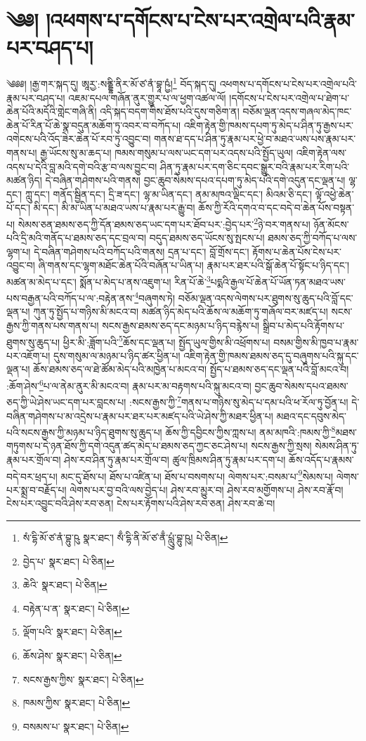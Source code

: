 \setcounter{footnote}{0} 
\chapter{༄༅། །འཕགས་པ་དགོངས་པ་ངེས་པར་འགྲེལ་པའི་རྣམ་པར་བཤད་པ།}༄༅༅། །རྒྱ་གར་སྐད་དུ། ཨཱརྱ་:སནྡྷི་ནིར་མོ་ཙ་ནཾ་བྷཱ་ཥྱཾ།\footnote{སཾ་དྷི་མོ་ཙ་ནཾ་བྷུ་ཥུ  སྣར་ཐང་། སྃ་དྷི་ནི་མོ་ཙ་ནྃ་པླུུཾ་བྷུ་ཥུ།  པེ་ཅིན། } བོད་སྐད་དུ། འཕགས་པ་དགོངས་པ་ངེས་པར་འགྲེལ་པའི་རྣམ་པར་བཤད་པ། འཇམ་དཔལ་གཞོན་ནུར་གྱུར་པ་ལ་ཕྱག་འཚལ་ལོ། །དགོངས་པ་ངེས་པར་འགྲེལ་པ་ཐེག་པ་ཆེན་པོའི་མདོའི་གླེང་གཞི་ནི། འདི་སྐད་བདག་གིས་ཐོས་པའི་དུས་གཅིག་ན། བཅོམ་ལྡན་འདས་གཞལ་མེད་ཁང་ཆེན་པོ་རིན་པོ་ཆེ་སྣ་བདུན་མཆོག་ཏུ་འབར་བ་བཀོད་པ། འཇིག་རྟེན་གྱི་ཁམས་དཔག་ཏུ་མེད་པ་ཤིན་ཏུ་རྒྱས་པར་འགེངས་པའི་འོད་ཟེར་ཆེན་པོ་རབ་ཏུ་འབྱུང་བ། གནས་ཐ་དད་པ་ཤིན་ཏུ་རྣམ་པར་ཕྱེ་བ་མཐའ་ཡས་པས་རྣམ་པར་གནས་པ། རྒྱ་ཡོངས་སུ་མ་ཆད་པ། ཁམས་གསུམ་པ་ལས་ཡང་དག་པར་འདས་པའི་སྤྱོད་ཡུལ། འཇིག་རྟེན་ལས་འདས་པ་དེའི་བླ་མའི་དགེ་བའི་རྩ་བ་ལས་བྱུང་བ། ཤིན་ཏུ་རྣམ་པར་དག་ཅིང་དབང་སྒྱུར་བའི་རྣམ་པར་རིག་པའི་མཚན་ཉིད། དེ་བཞིན་གཤེགས་པའི་གནས། བྱང་ཆུབ་སེམས་དཔའ་དཔག་ཏུ་མེད་པའི་དགེ་འདུན་དང་ལྡན་པ། ལྷ་དང་། ཀླུ་དང་། གནོད་སྦྱིན་དང་། དྲི་ཟ་དང་། ལྷ་མ་ཡིན་དང་། ནམ་མཁའ་ལྡིང་དང་། མིའམ་ཅི་དང་། ལྟོ་འཕྱེ་ཆེན་པོ་དང་། མི་དང་། མི་མ་ཡིན་པ་མཐའ་ཡས་པ་རྣམ་པར་རྒྱུ་བ། ཆོས་ཀྱི་རོའི་དགའ་བ་དང་བདེ་བ་ཆེན་པོས་བསྟན་པ། སེམས་ཅན་ཐམས་ཅད་ཀྱི་དོན་ཐམས་ཅད་ཡང་དག་པར་ཐོབ་པར་:བྱེད་པར་\footnote{བྱེད་པ་  སྣར་ཐང་།  པེ་ཅིན། }ཉེ་བར་གནས་པ། ཉོན་མོངས་པའི་དྲི་མའི་གནོད་པ་ཐམས་ཅད་དང་བྲལ་བ། བདུད་ཐམས་ཅད་ཡོངས་སུ་སྤངས་པ། ཐམས་ཅད་ཀྱི་བཀོད་པ་ལས་ལྷག་པ། དེ་བཞིན་གཤེགས་པའི་བཀོད་པའི་གནས། དྲན་པ་དང་། བློ་གྲོས་དང་། རྟོགས་པ་ཆེན་པོས་ངེས་པར་འབྱུང་བ། ཞི་གནས་དང་ལྷག་མཐོང་ཆེན་པོའི་བཞོན་པ་ཡིན་པ། རྣམ་པར་ཐར་པའི་སྒོ་ཆེན་པོ་སྟོང་པ་ཉིད་དང་། མཚན་མ་མེད་པ་དང་། སྨོན་པ་མེད་པ་ནས་འཇུག་པ། རིན་པོ་ཆེ་\footnote{ཆེའི་  སྣར་ཐང་།  པེ་ཅིན། }པདྨའི་རྒྱལ་པོ་ཆེན་པོ་ཡོན་ཏན་མཐའ་ཡས་པས་བརྒྱན་པའི་བཀོད་པ་ལ་:བརྟེན་ནས་\footnote{བརྟེན་པ་ན་  སྣར་ཐང་།  པེ་ཅིན། }བཞུགས་ཏེ། བཅོམ་ལྡན་འདས་ལེགས་པར་ཐུགས་སུ་ཆུད་པའི་བློ་དང་ལྡན་པ། ཀུན་ཏུ་སྤྱོད་པ་གཉིས་མི་མངའ་བ། མཚན་ཉིད་མེད་པའི་ཆོས་ལ་མཆོག་ཏུ་གཞོལ་བར་མཛད་པ། སངས་རྒྱས་ཀྱི་གནས་པས་གནས་པ། སངས་རྒྱས་ཐམས་ཅད་དང་མཉམ་པ་ཉིད་བརྙེས་པ། སྒྲིབ་པ་མེད་པའི་རྟོགས་པ་ཐུགས་སུ་ཆུད་པ། ཕྱིར་མི་:ཟློག་པའི་\footnote{ལྡོག་པའི་  སྣར་ཐང་།  པེ་ཅིན། }ཆོས་དང་ལྡན་པ། སྤྱོད་ཡུལ་གྱིས་མི་འཕྲོགས་པ། བསམ་གྱིས་མི་ཁྱབ་པ་རྣམ་པར་འཇོག་པ། དུས་གསུམ་ལ་མཉམ་པ་ཉིད་ཚར་ཕྱིན་པ། འཇིག་རྟེན་གྱི་ཁམས་ཐམས་ཅད་དུ་བཞུགས་པའི་སྐུ་དང་ལྡན་པ། ཆོས་ཐམས་ཅད་ལ་ཐེ་ཚོམ་མེད་པའི་མཁྱེན་པ་མངའ་བ། སྤྱོད་པ་ཐམས་ཅད་དང་ལྡན་པའི་བློ་མངའ་བ། :ཆོག་ཤེས་\footnote{ཆོས་ཤེས་  སྣར་ཐང་།  པེ་ཅིན། }པ་ལ་ནེམ་ནུར་མི་མངའ་བ། རྣམ་པར་མ་བརྟགས་པའི་སྐུ་མངའ་བ། བྱང་ཆུབ་སེམས་དཔའ་ཐམས་ཅད་ཀྱི་ཡེ་ཤེས་ཡང་དག་པར་བླངས་པ། :སངས་རྒྱས་ཀྱི་\footnote{སངས་རྒྱས་ཀྱིས་  སྣར་ཐང་།  པེ་ཅིན། }གནས་པ་གཉིས་སུ་མེད་པ་དམ་པའི་ཕ་རོལ་ཏུ་བྱོན་པ། དེ་བཞིན་གཤེགས་པ་མ་འདྲེས་པ་རྣམ་པར་ཐར་པར་མཛད་པའི་ཡེ་ཤེས་ཀྱི་མཐར་ཕྱིན་པ། མཐའ་དང་དབུས་མེད་པའི་སངས་རྒྱས་ཀྱི་མཉམ་པ་ཉིད་ཐུགས་སུ་ཆུད་པ། ཆོས་ཀྱི་དབྱིངས་ཀྱིས་ཀླས་པ། ནམ་མཁའི་:ཁམས་ཀྱི་\footnote{ཁམས་ཀྱིས་  སྣར་ཐང་།  པེ་ཅིན། }མཐས་གཏུགས་པ་དེ་ཉན་ཐོས་ཀྱི་དགེ་འདུན་ཚད་མེད་པ་ཐམས་ཅད་ཀྱང་ཅང་ཤེས་པ། སངས་རྒྱས་ཀྱི་སྲས། སེམས་ཤིན་ཏུ་རྣམ་པར་གྲོལ་བ། ཤེས་རབ་ཤིན་ཏུ་རྣམ་པར་གྲོལ་བ། ཚུལ་ཁྲིམས་ཤིན་ཏུ་རྣམ་པར་དག་པ། ཆོས་འདོད་པ་རྣམས་བདེ་བར་ཕྲད་པ། མང་དུ་ཐོས་པ། ཐོས་པ་འཛིན་པ། ཐོས་པ་བསགས་པ། ལེགས་པར་:བསམ་པ་\footnote{བསམས་པ་  སྣར་ཐང་།  པེ་ཅིན། }སེམས་པ། ལེགས་པར་སྨྲ་བ་བརྗོད་པ། ལེགས་པར་བྱ་བའི་ལས་བྱེད་པ། ཤེས་རབ་མྱུར་བ། ཤེས་རབ་མགྱོགས་པ། ཤེས་རབ་རྣོ་བ། ངེས་པར་འབྱུང་བའི་ཤེས་རབ་ཅན། ངེས་པར་རྟོགས་པའི་ཤེས་རབ་ཅན། ཤེས་རབ་ཆེ་བ། 